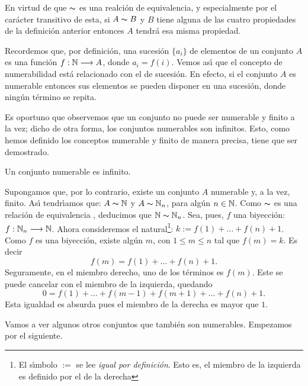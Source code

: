 En virtud de que $\thicksim$ es una realci\'on de equivalencia, y
especialmente por el car\'acter transitivo de esta, si $A\thicksim
B$ y $B$ tiene alguna de las cuatro propiedades de la definici\'on
anterior entonces $A$ tendr\'a esa misma propiedad.

Recordemos que, por definici\'on, una sucesi\'on $\{a_i\}$ de
elementos de un conjunto $A$ es una funci\'on
$f:\nn\longrightarrow A$, donde $a_i=f(i)$. Vemos as\'{\i} que el
concepto de numerabilidad est\'a relacionado con el de sucesi\'on.
En efecto, si el conjunto $A$ es numerable entonces sus elementos
se pueden disponer en una sucesi\'on, donde ning\'un t\'ermino se
repita.

Es oportuno que observemos que un conjunto no puede ser numerable
y finito a la vez; dicho de otra forma, los conjuntos numerables
son infinitos. Esto, como hemos definido los conceptos numerable y
finito de  manera precisa, tiene que ser demostrado.

\begin{teorema}\label{nesinfinito} Un conjunto numerable es
infinito.
\end{teorema}
\begin{demo} Supongamos que, por lo contrario, existe un conjunto
$A$ numerable y, a la vez, finito. As\'{\i} tendr\'{\i}amos que:
$A\thicksim\nn$ y $A\thicksim\nn_n$, para alg\'un $n\in\nn$. Como
$\thicksim$ es una relaci\'on de equivalencia , deducimos que
$\nn\thicksim\nn_n$. Sea, pues, $f$ una biyecci\'on:
$f:\nn_n\longrightarrow\nn$. Ahora consideremos el
natural\footnote{El s\'{\i}mbolo $:=$ se lee \emph{igual por
definici\'on}. Esto es, el miembro de la izquierda es definido por
el de la derecha}: $k:=f(1)+\dots+f(n)+1$. Como $f$ es una
biyecci\'on, existe alg\'un $m$, con $1\leq m\leq n$ tal que
$f(m)=k$. Es decir
\[f(m)=f(1)+\dots+f(n)+1.\]
Seguramente, en el miembro derecho, uno de los t\'erminos es
$f(m)$. Este se puede cancelar con el miembro de la izquierda,
quedando
\[0=f(1)+\dots+f(m-1)+f(m+1)+\dots+f(n)+1.\]
Esta igualdad es absurda pues el miembro de la derecha es mayor
que $1$.
\end{demo}

Vamos a ver algunos otros conjuntos que tambi\'en son numerables.
Empezamos por el siguiente.

